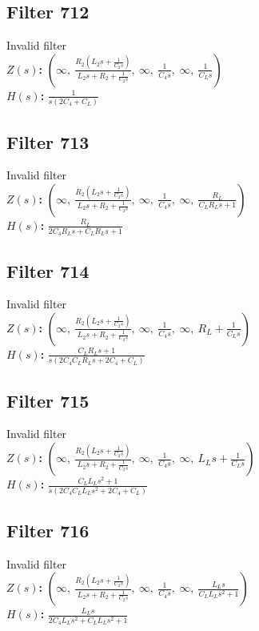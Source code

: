 \documentclass{article}
\begin{document}
\subsection*{Filter 712}
Invalid filter \\ 
\textbf{$Z(s)$:} $\left( \infty, \  \frac{R_{2} \left(L_{2} s + \frac{1}{C_{2} s}\right)}{L_{2} s + R_{2} + \frac{1}{C_{2} s}}, \  \infty, \  \frac{1}{C_{4} s}, \  \infty, \  \frac{1}{C_{L} s}\right)$ \\ 
\textbf{$H(s)$:} $\frac{1}{s \left(2 C_{4} + C_{L}\right)}$ \\ 
\subsection*{Filter 713}
Invalid filter \\ 
\textbf{$Z(s)$:} $\left( \infty, \  \frac{R_{2} \left(L_{2} s + \frac{1}{C_{2} s}\right)}{L_{2} s + R_{2} + \frac{1}{C_{2} s}}, \  \infty, \  \frac{1}{C_{4} s}, \  \infty, \  \frac{R_{L}}{C_{L} R_{L} s + 1}\right)$ \\ 
\textbf{$H(s)$:} $\frac{R_{L}}{2 C_{4} R_{L} s + C_{L} R_{L} s + 1}$ \\ 
\subsection*{Filter 714}
Invalid filter \\ 
\textbf{$Z(s)$:} $\left( \infty, \  \frac{R_{2} \left(L_{2} s + \frac{1}{C_{2} s}\right)}{L_{2} s + R_{2} + \frac{1}{C_{2} s}}, \  \infty, \  \frac{1}{C_{4} s}, \  \infty, \  R_{L} + \frac{1}{C_{L} s}\right)$ \\ 
\textbf{$H(s)$:} $\frac{C_{L} R_{L} s + 1}{s \left(2 C_{4} C_{L} R_{L} s + 2 C_{4} + C_{L}\right)}$ \\ 
\subsection*{Filter 715}
Invalid filter \\ 
\textbf{$Z(s)$:} $\left( \infty, \  \frac{R_{2} \left(L_{2} s + \frac{1}{C_{2} s}\right)}{L_{2} s + R_{2} + \frac{1}{C_{2} s}}, \  \infty, \  \frac{1}{C_{4} s}, \  \infty, \  L_{L} s + \frac{1}{C_{L} s}\right)$ \\ 
\textbf{$H(s)$:} $\frac{C_{L} L_{L} s^{2} + 1}{s \left(2 C_{4} C_{L} L_{L} s^{2} + 2 C_{4} + C_{L}\right)}$ \\ 
\subsection*{Filter 716}
Invalid filter \\ 
\textbf{$Z(s)$:} $\left( \infty, \  \frac{R_{2} \left(L_{2} s + \frac{1}{C_{2} s}\right)}{L_{2} s + R_{2} + \frac{1}{C_{2} s}}, \  \infty, \  \frac{1}{C_{4} s}, \  \infty, \  \frac{L_{L} s}{C_{L} L_{L} s^{2} + 1}\right)$ \\ 
\textbf{$H(s)$:} $\frac{L_{L} s}{2 C_{4} L_{L} s^{2} + C_{L} L_{L} s^{2} + 1}$ \\ 
\end{document}
